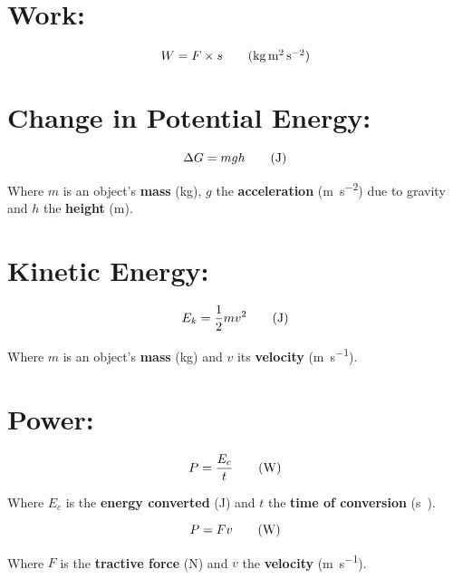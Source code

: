 \documentclass[11pt]{article}
\newcommand\textcenter[1]{
	\begin{center}
	#1
	\end{center}
}
\begin{document}
\section{Work: }

\begin{center}
	\begin{equation}
		W = F\times s\tag{\si{\kilogram\meter\squared\per\second\squared}}
	\end{equation}
\end{center}


\section{Change in Potential Energy: }

	\begin{equation}
		\Delta G = mgh\tag{\si{\joule}}
	\end{equation}
\textcenter{Where $m$ is an object's \textbf{mass} (\si{\kilogram}), $g$ the \textbf{acceleration} (\si{\meter\per\second\squared}) due to gravity and $h$ the \textbf{height} (\si{\meter}).}

\section{Kinetic Energy: }
\begin{equation}
	E_k = \frac{1}{2} mv^2\tag{\si{\joule}}
\end{equation}

\textcenter{Where $m$ is an object's \textbf{mass} (\si{\kilogram}) and $v$ its \textbf{velocity} (\si{\meter\per\second}).}

\section{Power: }

\begin{multicols}{2}
	\begin{equation}
	P = \frac{E_c}{t}\tag{\si{\watt}}
\end{equation}

\textcenter{Where $E_c$ is the \textbf{energy converted} (\si{\joule}) and $t$ the \textbf{time of conversion} (\si\second).}

\begin{equation}
	P = Fv\tag{\si{\watt}}
\end{equation}
\textcenter{Where $F$ is the \textbf{tractive force} (\si{\newton}) and $v$ the \textbf{velocity} (\si{\meter\per\second }).}
\end{multicols}
\end{document}
